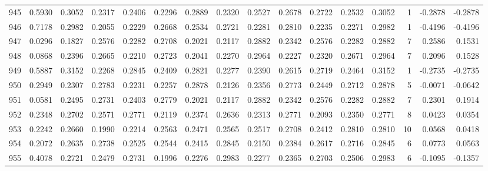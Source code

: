 \begin{tabular}{lrrrrrrrrrrrrrrr}
945 &      0.5930 &  0.3052 &  0.2317 &  0.2406 &  0.2296 &  0.2889 &  0.2320 &  0.2527 &  0.2678 &  0.2722 &   0.2532 &     0.3052 &      1 &                   -0.2878 &                    -0.2878 \\
946 &      0.7178 &  0.2982 &  0.2055 &  0.2229 &  0.2668 &  0.2534 &  0.2721 &  0.2281 &  0.2810 &  0.2235 &   0.2271 &     0.2982 &      1 &                   -0.4196 &                    -0.4196 \\
947 &      0.0296 &  0.1827 &  0.2576 &  0.2282 &  0.2708 &  0.2021 &  0.2117 &  0.2882 &  0.2342 &  0.2576 &   0.2282 &     0.2882 &      7 &                    0.2586 &                     0.1531 \\
948 &      0.0868 &  0.2396 &  0.2665 &  0.2210 &  0.2723 &  0.2041 &  0.2270 &  0.2964 &  0.2227 &  0.2320 &   0.2671 &     0.2964 &      7 &                    0.2096 &                     0.1528 \\
949 &      0.5887 &  0.3152 &  0.2268 &  0.2845 &  0.2409 &  0.2821 &  0.2277 &  0.2390 &  0.2615 &  0.2719 &   0.2464 &     0.3152 &      1 &                   -0.2735 &                    -0.2735 \\
950 &      0.2949 &  0.2307 &  0.2783 &  0.2231 &  0.2257 &  0.2878 &  0.2126 &  0.2356 &  0.2773 &  0.2449 &   0.2712 &     0.2878 &      5 &                   -0.0071 &                    -0.0642 \\
951 &      0.0581 &  0.2495 &  0.2731 &  0.2403 &  0.2779 &  0.2021 &  0.2117 &  0.2882 &  0.2342 &  0.2576 &   0.2282 &     0.2882 &      7 &                    0.2301 &                     0.1914 \\
952 &      0.2348 &  0.2702 &  0.2571 &  0.2771 &  0.2119 &  0.2374 &  0.2636 &  0.2313 &  0.2771 &  0.2093 &   0.2350 &     0.2771 &      8 &                    0.0423 &                     0.0354 \\
953 &      0.2242 &  0.2660 &  0.1990 &  0.2214 &  0.2563 &  0.2471 &  0.2565 &  0.2517 &  0.2708 &  0.2412 &   0.2810 &     0.2810 &     10 &                    0.0568 &                     0.0418 \\
954 &      0.2072 &  0.2635 &  0.2738 &  0.2525 &  0.2544 &  0.2415 &  0.2845 &  0.2150 &  0.2384 &  0.2617 &   0.2716 &     0.2845 &      6 &                    0.0773 &                     0.0563 \\
955 &      0.4078 &  0.2721 &  0.2479 &  0.2731 &  0.1996 &  0.2276 &  0.2983 &  0.2277 &  0.2365 &  0.2703 &   0.2506 &     0.2983 &      6 &                   -0.1095 &                    -0.1357 \\

\end{tabular}
